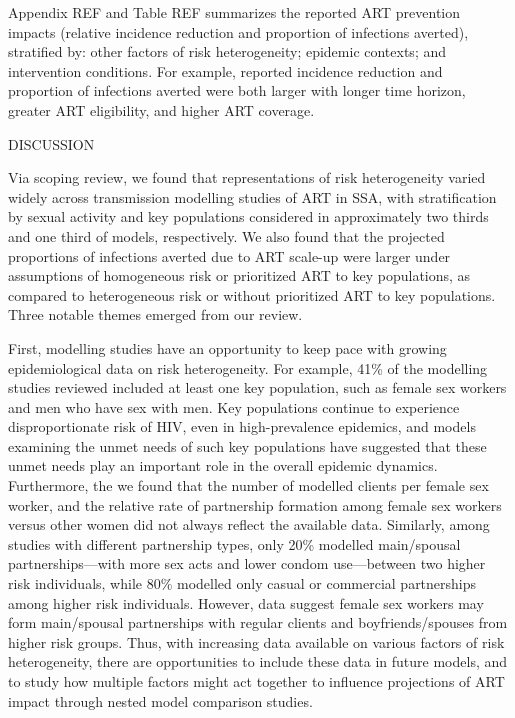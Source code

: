 Appendix REF and Table REF summarizes
the reported ART prevention impacts (relative incidence reduction and proportion of infections averted),
stratified by: other factors of risk heterogeneity; epidemic contexts; and intervention conditions.
For example, reported incidence reduction and proportion of infections averted
were both larger with longer time horizon, greater ART eligibility, and higher ART coverage.

DISCUSSION

Via scoping review, we found that representations of risk heterogeneity varied widely across
transmission modelling studies of ART in SSA, with
stratification by sexual activity and key populations considered in approximately
two thirds and one third of models, respectively.
We also found that the projected proportions of infections averted due to ART scale-up were
larger under assumptions of homogeneous risk or prioritized ART to key populations,
as compared to heterogeneous risk or without prioritized ART to key populations.
Three notable themes emerged from our review.

First, modelling studies have an opportunity to keep pace with growing epidemiological data on risk heterogeneity.
For example, 41\% of the modelling studies reviewed included at least one key population,
such as female sex workers and men who have sex with men.
Key populations continue to experience disproportionate risk of HIV, even in high-prevalence epidemics,
and models examining the unmet needs of such key populations have suggested that
these unmet needs play an important role in the overall epidemic dynamics.
Furthermore, the we found that the number of modelled clients per female sex worker, and
the relative rate of partnership formation among female sex workers versus other women
did not always reflect the available data.
Similarly, among studies with different partnership types, only 20\% modelled
main/spousal partnerships---with more sex acts and lower condom use---between two higher risk individuals,
while 80\% modelled only casual or commercial partnerships among higher risk individuals.
However, data suggest female sex workers may form main/spousal partnerships
with regular clients and boyfriends/spouses from higher risk groups.
Thus, with increasing data available on various factors of risk heterogeneity,
there are opportunities to include these data in future models,
and to study how multiple factors might act together to influence projections of ART impact
through nested model comparison studies.


